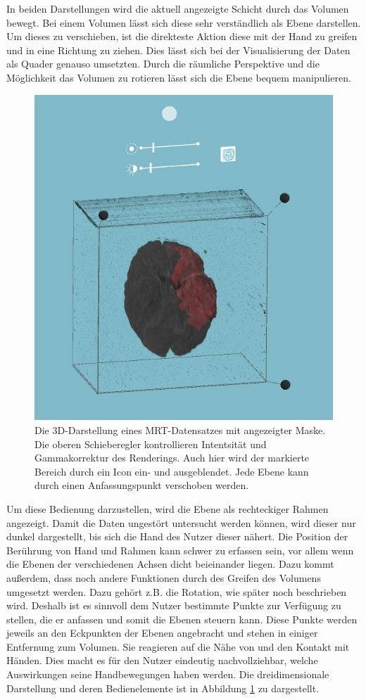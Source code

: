 In beiden Darstellungen wird die aktuell angezeigte Schicht durch das Volumen bewegt. Bei einem Volumen lässt sich diese sehr verständlich als Ebene darstellen. Um dieses zu verschieben, ist die direkteste Aktion diese mit der Hand zu greifen und in eine Richtung zu ziehen. 
Dies lässt sich bei der Visualisierung der Daten als Quader genauso umsetzten. Durch die räumliche Perspektive und die Möglichkeit das Volumen zu rotieren lässt sich die Ebene bequem manipulieren. 

\begin{figure}[!htb]
	\centering
	\includegraphics[width=0.5\linewidth]{images/mARt3d_2.png}
	\caption{Die 3D-Darstellung eines MRT-Datensatzes mit angezeigter Maske. Die oberen Schieberegler kontrollieren Intentsität und Gammakorrektur des Renderings. Auch hier wird der markierte Bereich durch ein Icon ein- und ausgeblendet. Jede Ebene kann durch einen Anfassungspunkt verschoben werden.}
	\label{img:mARt3d}
\end{figure}
\FloatBarrier

Um diese Bedienung darzustellen, wird die Ebene als rechteckiger Rahmen angezeigt. Damit die Daten ungestört untersucht werden können, wird dieser nur dunkel dargestellt, bis sich die Hand des Nutzer dieser nähert. 
Die Position der Berührung von Hand und Rahmen kann schwer zu erfassen sein, vor allem wenn die Ebenen der verschiedenen Achsen dicht beieinander liegen. Dazu kommt außerdem, dass noch andere Funktionen durch des Greifen des Volumens umgesetzt werden. Dazu gehört z.B. die Rotation, wie später noch beschrieben wird. Deshalb ist es sinnvoll dem Nutzer bestimmte Punkte zur Verfügung zu stellen, die er anfassen und somit die Ebenen steuern kann. Diese Punkte werden jeweils an den Eckpunkten der Ebenen angebracht und stehen in einiger Entfernung zum Volumen. Sie reagieren auf die Nähe von und den Kontakt mit Händen. Dies macht es für den Nutzer eindeutig nachvollziehbar, welche Auswirkungen seine Handbewegungen haben werden. 
Die dreidimensionale Darstellung und deren Bedienelemente ist in Abbildung \ref{img:mARt3d} zu dargestellt.

